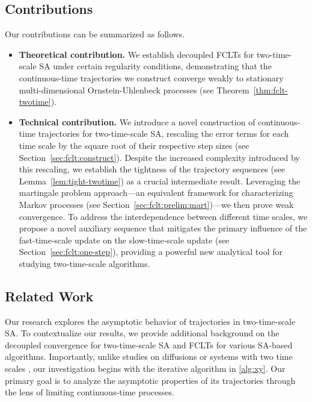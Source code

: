 \documentclass[11pt]{article}
\theoremstyle{plain}
\theoremstyle{definition}
\begin{document}
\subsection{Contributions} Our contributions can be summarized as follows.

\begin{itemize}
    \item \textbf{Theoretical contribution.} We establish decoupled FCLTs for two-time-scale SA under certain regularity conditions, demonstrating that the continuous-time trajectories we construct converge weakly to stationary multi-dimensional Ornstein-Uhlenbeck processes (see Theorem~\ref{thm:fclt-twotime}).
	
    \item \textbf{Technical contribution.} We introduce a novel construction of continuous-time trajectories for two-time-scale SA, rescaling the error terms for each time scale by the square root of their respective step sizes (see Section~\ref{sec:fclt:construct}). Despite the increased complexity introduced by this rescaling, we establish the tightness of the trajectory sequences (see Lemma~\ref{lem:tight-twotime}) as a crucial intermediate result. Leveraging the martingale problem approach—an equivalent framework for characterizing Markov processes (see Section~\ref{sec:fclt:prelim:mart})—we then prove weak convergence. To address the interdependence between different time scales, we propose a novel auxiliary sequence that mitigates the primary influence of the fast-time-scale update on the slow-time-scale update (see Section~\ref{sec:fclt:one-step}), providing a powerful new analytical tool for studying two-time-scale algorithms.

\end{itemize}


\subsection{Related Work}


Our research explores the asymptotic behavior of trajectories in two-time-scale SA. To contextualize our results, we provide additional background on the decoupled convergence for two-time-scale SA and FCLTs for various SA-based algorithms.
Importantly, unlike studies on diffusions or systems with two time scales \citep{Khasminskij1968OnTP, kushner1988almost, kokotovic1984applications, khasminskii2005limit}, our investigation begins with the iterative algorithm in \eqref{alg:xy}. Our primary goal is to analyze the asymptotic properties of its trajectories through the lens of limiting continuous-time processes.
\vspace{0.1cm}
\end{document}
